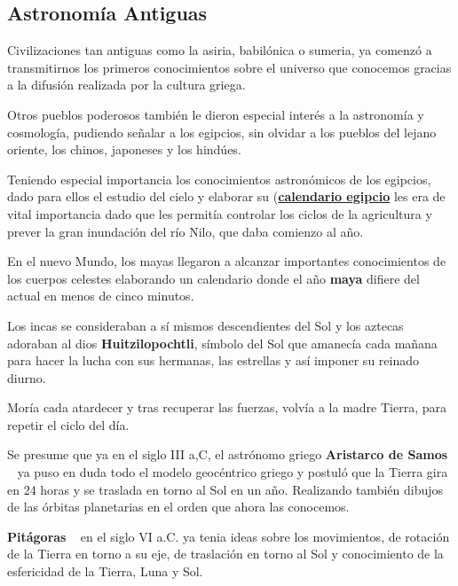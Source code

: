 \subsection{Astronomía Antiguas}

\bigskip
Civilizaciones tan antiguas como la asiria, babilónica o  sumeria, ya comenzó a transmitirnos los primeros conocimientos sobre el universo que conocemos gracias a la difusión realizada por la cultura griega.

\bigskip
Otros pueblos poderosos también le dieron especial interés a la astronomía y cosmología, pudiendo señalar a los egipcios, sin olvidar a  los pueblos del lejano oriente, los chinos, japoneses y los hindúes.

\bigskip
Teniendo especial importancia los conocimientos astronómicos de los egipcios, dado para ellos el estudio del cielo y elaborar su 
(\href{https://es.wikipedia.org/wiki/Calendario_egipcio}{\textbf{calendario egipcio}} les era de vital importancia dado que les permitía controlar los ciclos de la agricultura y prever la gran inundación del río Nilo, que daba comienzo al año.

\bigskip
En el nuevo Mundo, los mayas llegaron a alcanzar importantes conocimientos de los cuerpos celestes elaborando un calendario donde
el año \textbf{maya} difiere del actual en menos de cinco minutos.
\newline

\bigskip
Los incas se consideraban a sí mismos descendientes del Sol y los aztecas adoraban al dios \textbf{Huitzilopochtli}, símbolo del Sol
que amanecía cada mañana para hacer la lucha con sus hermanas, las estrellas
y así imponer su reinado diurno.
\newline

\bigskip
Moría cada atardecer y tras recuperar las fuerzas, volvía a la madre Tierra, para repetir el ciclo del día.

\bigskip
Se presume que ya en el  siglo III a,C, el astrónomo griego \textbf{Aristarco de Samos} ~\cite{Arist} ya puso en duda todo el modelo geocéntrico griego y postuló que la Tierra gira en 24 horas y se traslada en torno al Sol en un año. Realizando también dibujos de las órbitas planetarias en el orden que ahora las conocemos.

\bigskip
\textbf{Pitágoras} ~\cite{Pitagoras} en el siglo VI  a.C. ya tenia ideas sobre los movimientos, de rotación  de la Tierra en torno a su eje, de traslación en torno al Sol y conocimiento de la esfericidad de la Tierra, Luna y Sol.  ~\cite{AstroAnti}

